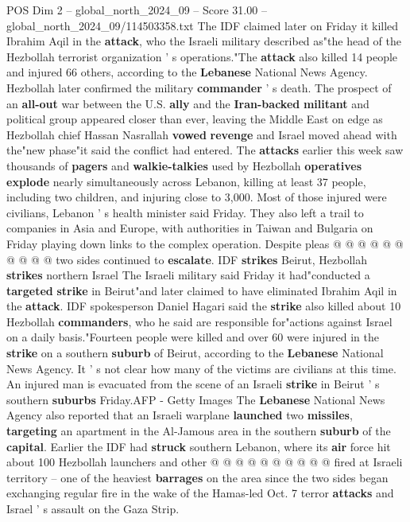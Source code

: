 \begin{textsample}{POS Dim 2 – global\_north\_2024\_09 – Score 31.00 – global\_north\_2024\_09/114503358.txt}  \label{ex:f2_pos_122}
The IDF claimed later on Friday it killed Ibrahim Aqil in the \textbf{attack}, who the Israeli military described as"the head of the Hezbollah terrorist organization ' s operations."The \textbf{attack} also killed 14 people and injured 66 others, according to the \textbf{Lebanese} National News Agency.
Hezbollah later confirmed the military \textbf{commander} ' s death.
The prospect of an \textbf{all-out} war between the U.S. \textbf{ally} and the \textbf{Iran-backed} \textbf{militant} and political group appeared closer than ever, leaving the Middle East on edge as Hezbollah chief Hassan Nasrallah \textbf{vowed} \textbf{revenge} and Israel moved ahead with the"new phase"it said the conflict had entered.
The \textbf{attacks} earlier this week saw thousands of \textbf{pagers} and \textbf{walkie-talkies} used by Hezbollah \textbf{operatives} \textbf{explode} nearly simultaneously across Lebanon, killing at least 37 people, including two children, and injuring close to 3,000.
Most of those injured were civilians, Lebanon ' s health minister said Friday.
They also left a trail to companies in Asia and Europe, with authorities in Taiwan and Bulgaria on Friday playing down links to the complex operation.
Despite pleas @ @ @ @ @ @ @ @ @ @ two sides continued to \textbf{escalate}.
IDF \textbf{strikes} Beirut, Hezbollah \textbf{strikes} northern Israel The Israeli military said Friday it had"conducted a \textbf{targeted} \textbf{strike} in Beirut"and later claimed to have eliminated Ibrahim Aqil in the \textbf{attack}.
IDF spokesperson Daniel Hagari said the \textbf{strike} also killed about 10 Hezbollah \textbf{commanders}, who he said are responsible for"actions against Israel on a daily basis."Fourteen people were killed and over 60 were injured in the \textbf{strike} on a southern \textbf{suburb} of Beirut, according to the \textbf{Lebanese} National News Agency.
It ' s not clear how many of the victims are civilians at this time.
An injured man is evacuated from the scene of an Israeli \textbf{strike} in Beirut ' s southern \textbf{suburbs} Friday.AFP - Getty Images The \textbf{Lebanese} National News Agency also reported that an Israeli warplane \textbf{launched} two \textbf{missiles}, \textbf{targeting} an apartment in the Al-Jamous area in the southern \textbf{suburb} of the \textbf{capital}.
Earlier the IDF had \textbf{struck} southern Lebanon, where its \textbf{air} force hit about 100 Hezbollah launchers and other @ @ @ @ @ @ @ @ @ @ fired at Israeli territory -- one of the heaviest \textbf{barrages} on the area since the two sides began exchanging regular fire in the wake of the Hamas-led Oct. 7 terror \textbf{attacks} and Israel ' s assault on the Gaza Strip.

\end{textsample}
